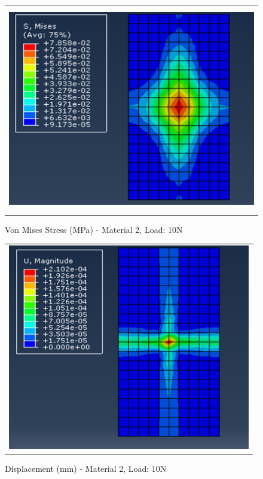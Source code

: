 \documentclass[a4paper,12pt]{article}
\numberwithin{equation}{section}
\numberwithin{figure}{section}
\begin{document}
\begin{figure}[H]
  \centering
  \begin{tabular}{@{}c@{}}
    \includegraphics[width=0.7\linewidth,height=255pt]{Results/Point Loading/M2_VMS_L2.png} \\
  \end{tabular}
  \caption{Von Mises Stress (MPa) - Material 2, Load: 10N}
\end{figure}

\begin{figure}[H]
  \centering
  \begin{tabular}{@{}c@{}}
    \includegraphics[width=0.7\linewidth,height=255pt]{Results/Point Loading/M2_DIS_L2.png} \\
  \end{tabular}
  \caption{Displacement (mm) - Material 2, Load: 10N}
\end{figure}
\end{document}
